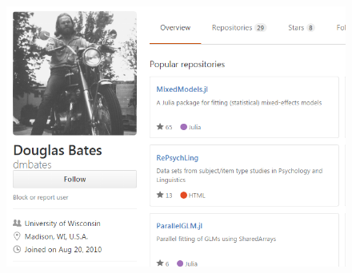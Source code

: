 \documentclass[Master.tex]{subfiles}
\begin{document}
\begin{frame}
\begin{figure}
\centering
\includegraphics[width=0.97\linewidth]{images/douglasbatesgithub}
\end{figure}
\end{frame}	
\end{document}
